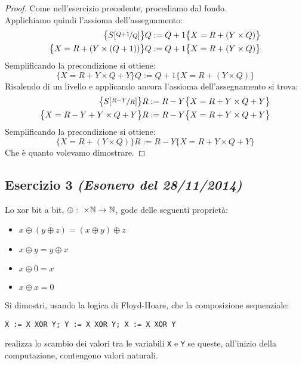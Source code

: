 \begin{proof}
Come nell'esercizio precedente, procediamo dal fondo.\\
Applichiamo quindi l'assioma dell'assegnamento:
\begin{align*}
  \bigl\{S[\nicefrac{Q+1}{Q}] \bigr\} & Q:=Q+1 \bigl\{X=R+(Y \times Q)\bigr\}\\
  \bigl\{X=R+(Y \times (Q+1)) \bigr\} & Q:=Q+1 \bigl\{X=R+(Y \times Q)\bigr\}
\end{align*}
Semplificando la precondizione si ottiene:
\[ \bigl\{X=R+Y \times Q + Y \bigr\} Q:=Q+1 \bigl\{X=R+(Y \times Q)\bigr\} \]
Risalendo di un livello e applicando ancora l'assioma dell'assegnamento si trova:
\begin{align*}
\bigl\{S[\nicefrac{R-Y}{R}] \bigr\} & R:=R-Y \bigl\{X=R+Y \times Q + Y \bigr\}\\
\bigl\{X= R-Y+Y \times Q+Y \bigr\} & R:=R-Y \bigl\{X=R+Y \times Q + Y \bigr\}
\end{align*}
Semplificando la precondizione si ottiene:
\[ \bigl\{X= R+(Y \times Q) \bigr\} R:=R-Y \bigl\{X=R+Y \times Q + Y \bigr\} \]
Che è quanto volevamo dimostrare.
\end{proof}

\subsection{Esercizio 3 \emph{(Esonero del 28/11/2014)}}
Lo xor bit a bit, $ \oplus: \ \times \mathbb{N} \rightarrow \mathbb{N} $, gode delle
seguenti proprietà:
\begin{itemize}
        \item $ x \oplus (y \oplus z) = (x \oplus y) \oplus z $ 
        \item $ x \oplus y = y \oplus x $ 
        \item $ x \oplus 0 = x $ 
        \item $ x \oplus x = 0 $ 
\end{itemize}
Si dimostri, usando la logica di Floyd-Hoare, che la composizione sequenziale:
\begin{center}
\texttt{X := X XOR Y; Y := X XOR Y; X := X XOR Y}
\end{center}
realizza lo scambio dei valori tra le variabili \texttt{X} e \texttt{Y} se queste, all'inizio della computazione, contengono valori naturali.

